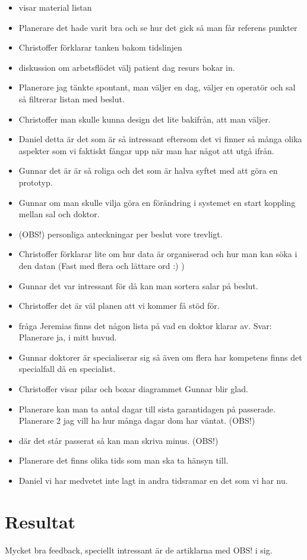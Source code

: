 \documentclass[a4paper,10pt, twoside]{article}
\begin{document}
\begin{itemize}
    \item visar material listan
    \item Planerare det hade varit bra och se hur det gick så man får referens punkter
    \item Christoffer förklarar tanken bakom tidslinjen
    \item diskussion om arbetsflödet välj patient dag resurs bokar in.
    \item Planerare jag tänkte spontant, man väljer en dag, väljer en operatör och sal så filtrerar listan med beslut.
    \item Christoffer man skulle kunna design det lite bakifrån, att man väljer.
    \item Daniel detta är det som är så intressant eftersom det vi finner så många olika aspekter som vi faktiskt fångar upp när man har något att utgå ifrån.
    \item Gunnar det är är så roliga och det som är halva syftet med att göra en prototyp.
    \item Gunnar om man skulle vilja göra en förändring i systemet en start koppling mellan sal och doktor.
    \item (OBS!) personliga anteckningar per beslut vore trevligt.
    \item Christoffer förklarar lite om hur data är organiserad och hur man kan söka i den datan (Fast med flera och lättare ord :) )
    \item Gunnar det var intressant för då kan man sortera salar på beslut.
    \item Christoffer det är väl planen att vi kommer få stöd för.
    \item fråga Jeremias finns det någon lista på vad en doktor klarar av. Svar: Planerare ja, i mitt huvud.
    \item Gunnar doktorer är specialiserar sig så även om flera har kompetens finns det specialfall då en specialist.
    \item Christoffer visar pilar och boxar diagrammet Gunnar blir glad.
    \item Planerare kan man ta antal dagar till sista garantidagen på passerade. Planerare 2 jag vill ha hur många dagar dom har väntat. (OBS!)
    \item där det står passerat så kan man skriva minus. (OBS!)
    \item Planerare det finns olika tids som man ska ta hänsyn till.
    \item Daniel  vi har medvetet inte lagt in andra tidsramar en det som vi har nu.
\end{itemize}

\section{Resultat}
Mycket bra feedback, speciellt intressant är de artiklarna med OBS! i sig.
\end{document}
